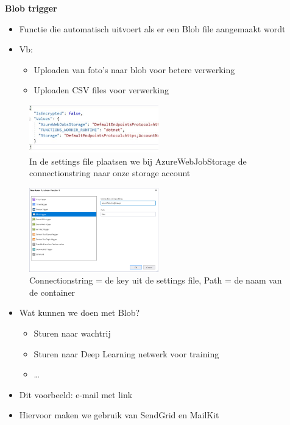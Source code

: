 \documentclass{article}
\newcommand{\bold}[1]{\textbf{#1}}
\begin{document}
\bold{Blob trigger}

\begin{itemize}
    \item Functie die automatisch uitvoert als er een Blob file aangemaakt wordt
    \item Vb:
    \begin{itemize}
        \item Uploaden van foto's naar blob voor betere verwerking
        \item Uploaden CSV files voor verwerking
    \end{itemize}
\end{itemize}

\begin{figure}[H]
    \centering
    \includegraphics[width=0.5\textwidth]{scenario-2-1.png}
    \caption{In de settings file plaatsen we bij AzureWebJobStorage de connectionstring naar onze storage account}
\end{figure}

\begin{figure}[H]
    \centering
    \includegraphics[width=0.5\textwidth]{scenario-2-2.png}
    \caption{Connectionstring = de key uit de settings file, Path = de naam van de container}
\end{figure}

\begin{itemize}
    \item Wat kunnen we doen met Blob?
    \begin{itemize}
        \item Sturen naar wachtrij
        \item Sturen naar Deep Learning netwerk voor training
        \item \dots
    \end{itemize}
    \item Dit voorbeeld: e-mail met link
    \item Hiervoor maken we gebruik van SendGrid en MailKit
\end{itemize}
\end{document}
